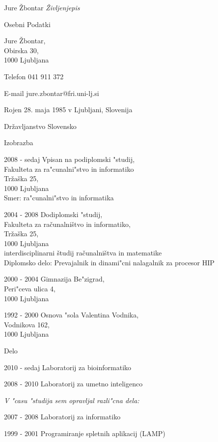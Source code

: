 \documentclass[12pt,a4paper]{article}
\begin{document}
\begin{cv}{Jure Žbontar}
\noindent \emph{Življenjepis}

\begin{cvlist}{Osebni Podatki}
\item Jure Žbontar, \\
Obirska 30, \\
1000 Ljubljana

\item[Telefon]  041 911 372 
\item[E-mail] jure.zbontar@fri.uni-lj.si

\item[Rojen] 28. maja 1985 v Ljubljani, Slovenija
\item[Državljanstvo] Slovensko

\end{cvlist}

\begin{cvlist}{Izobrazba}
\item[2008 - sedaj] Vpisan na podiplomski "studij,\\
Fakulteta za ra"cunalni"stvo in informatiko \\
Tržaška 25, \\
1000 Ljubljana \\[.3cm]
Smer: ra"cunalni"stvo in informatika

\item[2004 - 2008] Dodiplomski "studij,\\
Fakulteta za računalništvo in informatiko, \\
Tržaška 25, \\
1000 Ljubljana \\[.3cm]
interdisciplinarni študij računalništva in matematike \\[.3cm]
Diplomsko delo: Prevajalnik in dinami"cni nalagalnik za procesor HIP

\item[2000 - 2004] Gimnazija Be"zigrad, \\
Peri"ceva ulica 4, \\
1000 Ljubljana

\item[1992 - 2000] Osnova "sola Valentina Vodnika, \\
Vodnikova 162, \\
1000 Ljubljana
\end{cvlist}

\begin{cvlist}{Delo}
\item[2010 - sedaj] Laboratorij za bioinformatiko
\item[2008 - 2010] Laboratorij za umetno inteligenco
\item \textit{V "casu "studija sem opravljal razli"cna dela:}
\item[2007 - 2008] Laboratorij za informatiko
\item[1999 - 2001] Programiranje spletnih aplikacij (LAMP)
\end{cvlist}


\end{cv}
\end{document}
